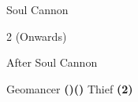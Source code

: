 \begin{paracol}{2}
\begin{boss}{Soul Cannon}
	\varwb
	\begin{round}{1}
        \faris \leftCommand{\throw} \then \thunderScroll
        \lenna \leftCommand{\throw} \then \thunderScroll
        \galuf \leftCommand{\throw} \then \thunderScroll
        \bartz \rightCommand{\black} \then \bolt
	\end{round}
    \begin{round}{2 (Onwards)}
        \bartz \rightCommand{\black} \then \bolt
        \everyoneElse \leftCommand{\throw} \then \thunderScroll
	\end{round}
	\varwe
\end{boss}

\begin{menu}{After Soul Cannon}
    \varwb
    \begin{jobMenu}
        \faris Geomancer \textbf{(\pointUp)(\pointLeft)}
        \bartz Thief \textbf{(2\pointRight)} \ability{!\escape}
    \end{jobMenu}
    \varwe
\end{menu}

\end{paracol}